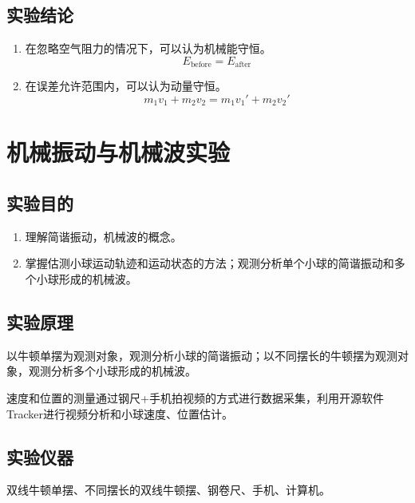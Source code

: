 \documentclass[UTF8]{article}
\begin{document}
\begin{enumerate}
\begin{enumerate}[left=2em, label=\arabic*)]
\begin{table}[H]
\begin{tabularx}{\textwidth}
                                \end{tabularx}
                                \caption{质量比3.835，初始高度7.5cm}
                                \label{form:3.835-7.5}
                            \end{table}
                    \end{enumerate}
            \end{enumerate}
        \subsection{实验结论}
            \noindent\hspace{2em}
                \begin{enumerate}[left=2em, label=\arabic*)]
                    \item 在忽略空气阻力的情况下，可以认为机械能守恒。
                    $$ E_{\text{before}} = E_{\text{after}} $$
                    \item 在误差允许范围内，可以认为动量守恒。
                    $$ m_1v_1 + m_2v_2 = m_1v_1' + m_2v_2' $$
                \end{enumerate}
    \section{机械振动与机械波实验}
        \subsection{实验目的}
            \begin{enumerate}[left=2em, label=(\arabic*)]
                \item 理解简谐振动，机械波的概念。
                \item 掌握估测小球运动轨迹和运动状态的方法；观测分析单个小球的简谐振动和多个小球形成的机械波。
            \end{enumerate}
        \subsection{实验原理}
            \noindent\hspace{2em}以牛顿单摆为观测对象，观测分析小球的简谐振动；以不同摆长的牛顿摆为观测对象，观测分析多个小球形成的机械波。

            \noindent\hspace{2em}速度和位置的测量通过钢尺+手机拍视频的方式进行数据采集，利用开源软件Tracker进行视频分析和小球速度、位置估计。
        \subsection{实验仪器}
            \noindent\hspace{2em}双线牛顿单摆、不同摆长的双线牛顿摆、钢卷尺、手机、计算机。
\end{document}
